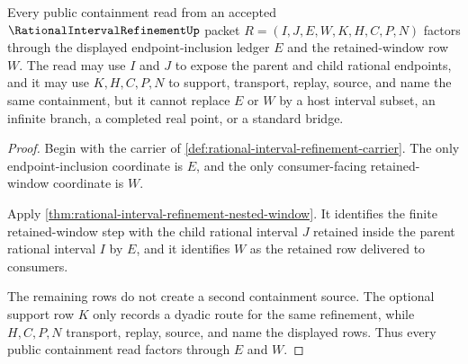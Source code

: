 \begin{theorem}
\label{thm:rational-interval-refinement-endpoint-exactness}
Every public containment read from an accepted $\RationalIntervalRefinementUp$ packet $R=(I,J,E,W,K,H,C,P,N)$ factors through the displayed endpoint-inclusion ledger $E$ and the retained-window row $W$. The read may use $I$ and $J$ to expose the parent and child rational endpoints, and it may use $K,H,C,P,N$ to support, transport, replay, source, and name the same containment, but it cannot replace $E$ or $W$ by a host interval subset, an infinite branch, a completed real point, or a standard bridge.
\end{theorem}
\begin{proof}
Begin with the carrier of \autoref{def:rational-interval-refinement-carrier}. The only endpoint-inclusion coordinate is $E$, and the only consumer-facing retained-window coordinate is $W$.

Apply \autoref{thm:rational-interval-refinement-nested-window}. It identifies the finite retained-window step with the child rational interval $J$ retained inside the parent rational interval $I$ by $E$, and it identifies $W$ as the retained row delivered to consumers.

The remaining rows do not create a second containment source. The optional support row $K$ only records a dyadic route for the same refinement, while $H,C,P,N$ transport, replay, source, and name the displayed rows. Thus every public containment read factors through $E$ and $W$.
\end{proof}

